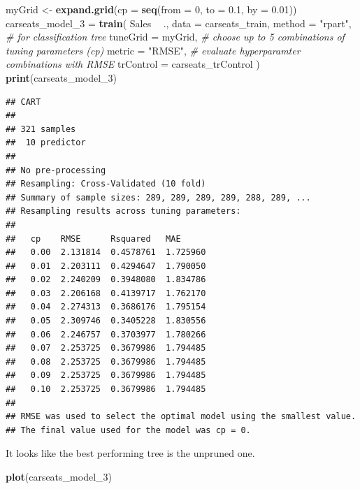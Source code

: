 \documentclass[
]{book}
\newenvironment{Shaded}{\begin{snugshade}}{\end{snugshade}}
\newcommand{\CommentTok}[1]{\textcolor[rgb]{0.56,0.35,0.01}{\textit{#1}}}
\newcommand{\DataTypeTok}[1]{\textcolor[rgb]{0.13,0.29,0.53}{#1}}
\newcommand{\DecValTok}[1]{\textcolor[rgb]{0.00,0.00,0.81}{#1}}
\newcommand{\FloatTok}[1]{\textcolor[rgb]{0.00,0.00,0.81}{#1}}
\newcommand{\KeywordTok}[1]{\textcolor[rgb]{0.13,0.29,0.53}{\textbf{#1}}}
\newcommand{\NormalTok}[1]{#1}
\newcommand{\OperatorTok}[1]{\textcolor[rgb]{0.81,0.36,0.00}{\textbf{#1}}}
\newcommand{\StringTok}[1]{\textcolor[rgb]{0.31,0.60,0.02}{#1}}
\begin{document}
\begin{Shaded}
\begin{Highlighting}[]
\NormalTok{myGrid <-}\StringTok{  }\KeywordTok{expand.grid}\NormalTok{(}\DataTypeTok{cp =} \KeywordTok{seq}\NormalTok{(}\DataTypeTok{from =} \DecValTok{0}\NormalTok{, }\DataTypeTok{to =} \FloatTok{0.1}\NormalTok{, }\DataTypeTok{by =} \FloatTok{0.01}\NormalTok{))}
\NormalTok{carseats_model_}\DecValTok{3}\NormalTok{ =}\StringTok{ }\KeywordTok{train}\NormalTok{(}
\NormalTok{   Sales }\OperatorTok{~}\StringTok{ }\NormalTok{., }
   \DataTypeTok{data =}\NormalTok{ carseats_train, }
   \DataTypeTok{method =} \StringTok{"rpart"}\NormalTok{,  }\CommentTok{# for classification tree}
   \DataTypeTok{tuneGrid =}\NormalTok{ myGrid,  }\CommentTok{# choose up to 5 combinations of tuning parameters (cp)}
   \DataTypeTok{metric =} \StringTok{"RMSE"}\NormalTok{,  }\CommentTok{# evaluate hyperparamter combinations with RMSE}
   \DataTypeTok{trControl =}\NormalTok{ carseats_trControl}
\NormalTok{)}
\KeywordTok{print}\NormalTok{(carseats_model_}\DecValTok{3}\NormalTok{)}
\end{Highlighting}
\end{Shaded}

\begin{verbatim}
## CART 
## 
## 321 samples
##  10 predictor
## 
## No pre-processing
## Resampling: Cross-Validated (10 fold) 
## Summary of sample sizes: 289, 289, 289, 289, 288, 289, ... 
## Resampling results across tuning parameters:
## 
##   cp    RMSE      Rsquared   MAE     
##   0.00  2.131814  0.4578761  1.725960
##   0.01  2.203111  0.4294647  1.790050
##   0.02  2.240209  0.3948080  1.834786
##   0.03  2.206168  0.4139717  1.762170
##   0.04  2.274313  0.3686176  1.795154
##   0.05  2.309746  0.3405228  1.830556
##   0.06  2.246757  0.3703977  1.780266
##   0.07  2.253725  0.3679986  1.794485
##   0.08  2.253725  0.3679986  1.794485
##   0.09  2.253725  0.3679986  1.794485
##   0.10  2.253725  0.3679986  1.794485
## 
## RMSE was used to select the optimal model using the smallest value.
## The final value used for the model was cp = 0.
\end{verbatim}

It looks like the best performing tree is the unpruned one.

\begin{Shaded}
\begin{Highlighting}[]
\KeywordTok{plot}\NormalTok{(carseats_model_}\DecValTok{3}\NormalTok{)}
\end{Highlighting}
\end{Shaded}
\end{document}
